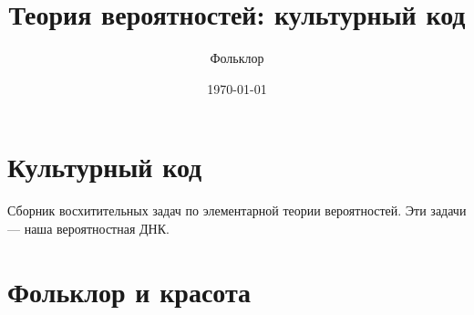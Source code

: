 \documentclass[nobib]{tufte-handout}
\title{Теория вероятностей: культурный код}
\author{Фольклор}
\date{\today}
\theoremstyle{definition}
\begin{document}
\maketitle

\section{Культурный код}

Сборник восхитительных задач по элементарной теории вероятностей. Эти задачи — наша вероятностная ДНК.

\section{Фольклор и красота}


\end{document}
